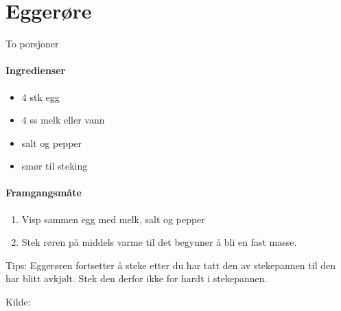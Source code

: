 \section{Eggerøre}
To porsjoner

\paragraph{Ingredienser}
\begin{itemize}[noitemsep]
	\item 4 stk egg
	\item 4 ss melk eller vann
	\item salt og pepper
	\item smør til steking
\end{itemize}

\paragraph{Framgangsmåte}
\begin{enumerate}[noitemsep]
	\item Visp sammen egg med melk, salt og pepper
	\item Stek røren på middels varme til det begynner å bli en fast masse.
\end{enumerate}

Tips: Eggerøren fortsetter å steke etter du har tatt den av stekepannen til den har blitt avkjølt. Stek den derfor ikke for hardt i stekepannen.

Kilde: \href{http://www.matprat.no/sunn/sunne-oppskrifter/sunne-oppskrifter-god-samvittighet/eggerore/}{}
